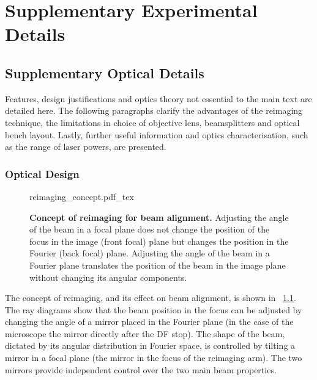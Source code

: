 \documentclass[12pt, a4paper, twoside]{book}
\begin{document}
\FloatBarrier
\chapter{Supplementary Experimental Details}

\section{Supplementary Optical Details}

Features, design justifications and optics theory not essential to the main text are detailed here. The following paragraphs clarify the advantages of the reimaging technique, the limitations in choice of objective lens, beamsplitters and optical bench layout. Lastly, further useful information and optics characterisation, such as the range of laser powers, are presented.

\subsection{Optical Design}

\begin{figure}
\centering
{reimaging_concept.pdf_tex}
\caption*
{\textbf{Concept of reimaging for beam alignment.} Adjusting the angle of the beam in a focal plane does not change the position of the focus in the image (front focal) plane but changes the position in the Fourier (back focal) plane. Adjusting the angle of the beam in a Fourier plane translates the position of the beam in the image plane without changing its angular components.}
\label{fig:reimaging_concept}
\end{figure}

The concept of reimaging, and its effect on beam alignment, is shown in \figurename~\ref{fig:reimaging_concept}. The ray diagrams show that the beam position in the focus can be adjusted by changing the angle of a mirror placed in the Fourier plane (in the case of the microscope the mirror directly after the DF stop). The shape of the beam, dictated by its angular distribution in Fourier space, is controlled by tilting a mirror in a focal plane (the mirror in the focus of the reimaging arm). The two mirrors provide independent control over the two main beam properties.
\end{document}
